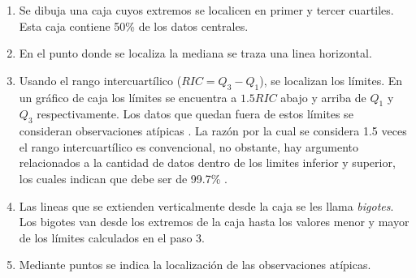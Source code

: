 \documentclass[
]{book}
\providecommand{\tightlist}{%
  \setlength{\itemsep}{0pt}\setlength{\parskip}{0pt}}
\begin{document}
\begin{enumerate}
\def\labelenumi{\arabic{enumi}.}
\tightlist
\item
  Se dibuja una caja cuyos extremos se localicen en primer y tercer cuartiles. Esta caja contiene 50\% de los datos centrales.
\item
  En el punto donde se localiza la mediana se traza una linea horizontal.
\item
  Usando el rango intercuartílico (\(RIC = Q_3-Q_1\)), se localizan los límites. En un gráfico de caja los límites se encuentra a \(1.5RIC\) abajo y arriba de \(Q_1\) y \(Q_3\) respectivamente. Los datos que quedan fuera de estos límites se consideran observaciones atípicas \citep{Tukey}. La razón por la cual se considera 1.5 veces el rango intercuartílico es convencional, no obstante, hay argumento relacionados a la cantidad de datos dentro de los limites inferior y superior, los cuales indican que debe ser de 99.7\% \citep{James2013}.
\item
  Las lineas que se extienden verticalmente desde la caja se les llama \emph{bigotes}. Los bigotes van desde los extremos de la caja hasta los valores menor y mayor de los límites calculados en el paso 3.
\item
  Mediante puntos se indica la localización de las observaciones atípicas.
\end{enumerate}
\end{document}
